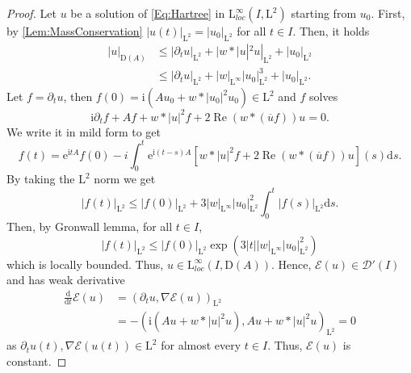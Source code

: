 \documentclass[10pt,a4paper]{amsart}
\DeclareMathOperator{\re}{Re}
\def \p {\partial}
\def\L{\mathrm L}
\def\d{\mathrm{d}}
\newcommand{\complexI}{\mathrm{i}} %
\newcommand{\e}{\mathrm{e}} %
\begin{document}
\begin{proof}

    Let $u$ be a solution of \cref{Eq:Hartree} in $\L^\infty_{loc}(I,\L^2)$ starting from $u_0$. First, by \cref{Lem:MassConservation} $|u(t)|_{\L^2}=|u_0|_{\L^2}$ for all $t\in I$. Then, it holds
    \begin{align*}
        |u|_{\mathrm{D}(A)}&\leqslant|\p_tu|_{\L^2}+|w*|u|^2u|_{\L^2}+|u_0|_{\L^2}\\
        &\leqslant|\p_tu|_{\L^2} + |w|_{\L^\infty}|u_0|_{\L^2}^3+|u_0|_{\L^2}.
    \end{align*}
    Let $f=\p_tu$, then $f(0)=\complexI\left(Au_0+w*|u_0|^2u_0\right)\in\L^2$ and $f$ solves
    $$\complexI\p_tf+Af+w*|u|^2f+2\re(w*(\overline{u}f))u=0.$$
    We write it in mild form to get
    $$f(t)=\e^{\complexI t A}f(0)-i\int_0^t\e^{\complexI (t-s) A}\left[w*|u|^2f+2\re(w*(\overline{u}f))u\right](s)\d s.$$
    By taking the $\L^2$ norm we get
    $$|f(t)|_{\L^2}\leqslant |f(0)|_{\L^2}+3|w|_{\L^\infty}|u_0|_{\L^2}^2\int_0^t|f(s)|_{\L^2}\d s.$$
    Then, by Gronwall lemma, for all $t\in I$,
    $$|f(t)|_{\L^2}\leqslant |f(0)|_{\L^2}\exp\left(3|t||w|_{\L^\infty}|u_0|_{\L^2}^2\right)$$
    which is locally bounded. Thus, $u\in\L^{\infty}_{loc}(I,\mathrm{D}(A))$. Hence, $\mathcal{E}(u)\in\mathcal{D}'(I)$ and has weak derivative
    \begin{align*}
        \frac{\d}{\d t}\mathcal{E}(u) &=\left(\p_t u,\nabla\mathcal{E}(u)\right)_{\L^2}\\
        &= - \left(\complexI(Au+w*|u|^2u),Au+w*|u|^2u\right)_{\L^2} = 0
    \end{align*}
    as $\p_t u(t),\nabla\mathcal{E}(u(t))\in\L^2$ for almost every $t\in I$. Thus, $\mathcal{E}(u)$ is constant.

\end{proof}
\end{document}
